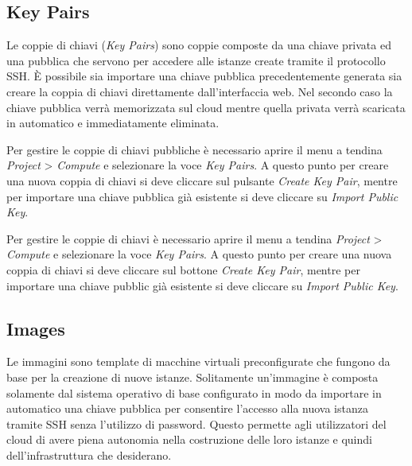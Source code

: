\subsection{Key Pairs}
Le coppie di chiavi (\textit{Key Pairs}) sono coppie composte da una chiave privata ed una pubblica che servono per accedere alle istanze create tramite il protocollo SSH. È possibile sia importare una chiave pubblica precedentemente generata sia creare la coppia di chiavi direttamente dall'interfaccia web. Nel secondo caso la chiave pubblica verrà memorizzata sul cloud mentre quella privata verrà scaricata in automatico e immediatamente eliminata.

Per gestire le coppie di chiavi pubbliche è necessario aprire il menu a tendina \textit{Project} > \textit{Compute} e selezionare la voce \textit{Key Pairs}. A questo punto per creare una nuova coppia di chiavi si deve cliccare sul pulsante \textit{Create Key Pair}, mentre per importare una chiave pubblica già esistente si deve cliccare su \textit{Import Public Key}.

Per gestire le coppie di chiavi è necessario aprire il menu a tendina \textit{Project} > \textit{Compute} e selezionare la voce \textit{Key Pairs}. A questo punto per creare una nuova coppia di chiavi si deve cliccare sul bottone \textit{Create Key Pair}, mentre per importare una chiave pubblic già esistente si deve cliccare su \textit{Import Public Key}.

\subsection{Images}
Le immagini sono template di macchine virtuali preconfigurate che fungono da base per la creazione di nuove istanze. Solitamente un'immagine è composta solamente dal sistema operativo di base configurato in modo da importare in automatico una chiave pubblica per consentire l'accesso alla nuova istanza tramite SSH senza l'utilizzo di password. Questo permette agli utilizzatori del cloud di avere piena autonomia nella costruzione delle loro istanze e quindi dell'infrastruttura che desiderano.

